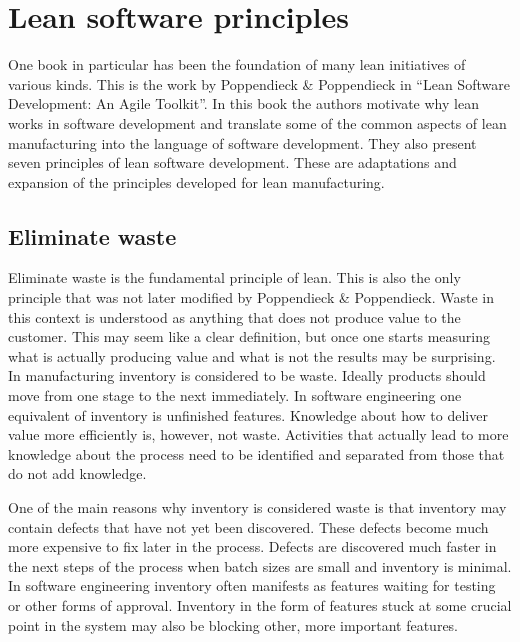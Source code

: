 \section{Lean software principles}
\label{section:leansoftwareprinciples}

One book in particular has been the foundation of many lean initiatives of various kinds. This is the work by Poppendieck \& Poppendieck in ``Lean Software Development: An Agile Toolkit''. In this book the authors motivate why lean works in software development and translate some of the common aspects of lean manufacturing into the language of software development. They also present seven principles of lean software development. These are adaptations and expansion of the principles developed for lean manufacturing.\cite{poppendieck2003lean}

\subsection{Eliminate waste}

Eliminate waste is the fundamental principle of lean. This is also the only principle that was not later modified by Poppendieck \& Poppendieck.\cite{Poppendieck2012Lean} Waste in this context is understood as anything that does not produce value to the customer. This may seem like a clear definition, but once one starts measuring what is actually producing value and what is not the results may be surprising. In manufacturing inventory is considered to be waste. Ideally products should move from one stage to the next immediately. In software engineering one equivalent of inventory is unfinished features.\cite{poppendieck2003lean} Knowledge about how to deliver value more efficiently is, however, not waste\cite{Poppendieck2012Lean}. Activities that actually lead to more knowledge about the process need to be identified and separated from those that do not add knowledge.

One of the main reasons why inventory is considered waste is that inventory may contain defects that have not yet been discovered. These defects become much more expensive to fix later in the process. Defects are discovered much faster in the next steps of the process when batch sizes are small and inventory is minimal. In software engineering inventory often manifests as features waiting for testing or other forms of approval. Inventory in the form of features stuck at some crucial point in the system may also be blocking other, more important features.\cite{poppendieck2003lean}

